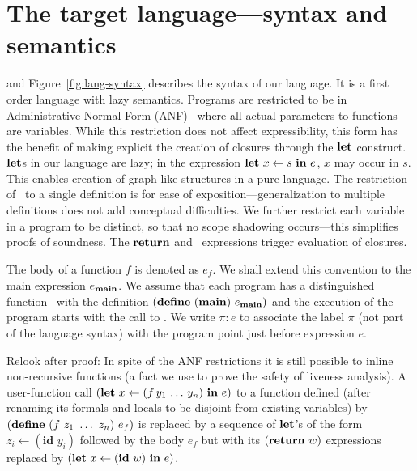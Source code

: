 \documentclass[9pt]{sigplanconf}
\newcommand{\ID}{\mbox{$\mathbf{ id}$}}
\begin{document}
\section{The target language---syntax and semantics}
\label{sec:defs}
and
Figure~\ref{fig:lang-syntax} describes the  syntax of our language. It
is a first order language with lazy semantics. Programs are restricted
to        be        in        Administrative        Normal        Form
(ANF)~\cite{chakravarty03perspective}  where all actual  parameters to
functions  are  variables.  While  this  restriction  does not  affect
expressibility,  this form  has  the benefit  of  making explicit  the
creation  of closures through  the $\mbox{$\mathbf{ let}$}$  construct.  $\mbox{$\mathbf{ let}$}$s  in our
language  are lazy;  in the  expression $\mbox{$\mathbf{ let}$}\,\,  x  \leftarrow s\,\,
\mbox{$\mathbf{ in}$}\,\, e$, $x$ may occur  in $s$. This enables creation of graph-like
structures in  a pure language. The  restriction of \LET\  to a single
definition  is  for ease  of  exposition---generalization to  multiple
definitions  does  not add conceptual  difficulties.  We  further
restrict each variable  in a program to be distinct,  so that no scope
shadowing   occurs---this  simplifies   proofs   of  soundness.    The
$\mbox{$\mathbf{ return}$}$ and \SIF\ expressions trigger evaluation of closures.

The body  of a function ${\mathit  f}$ is denoted  as $e_{\mathit f}$.
We   shall   extend   this   convention   to   the   main   expression
$e_{\mathbf{main}}$. We assume that each program has a distinguished function
\mainpgm\      with      the      definition     $(\mbox{$\mathbf{define}$}\      ({\tt
  \mathbf{main}})\  e_{\mathbf{main}})$ and  the execution  of the  program starts
with the call to \mainpgm.  We write $\pi\!:\!e$ to associate the label
$\pi$ (not  part of the language  syntax) with the  program point just
before expression $e$.

{ \color {Myblue} Relook after proof: In spite of the  ANF restrictions
it
  is still possible  to inline non-recursive functions (a  fact we use
  to  prove the safety  of liveness  analysis).  A  user-function call
  $(\mbox{$\mathbf{ let}$}\,\, x \leftarrow (f\,y_1\,\ldots\,y_n)  \,\, \mbox{$\mathbf{ in}$}\,\, e)$ to a
  function  defined  (after renaming  its  formals  and  locals to  be
  disjoint         from         existing         variables)         by
  $(\mbox{$\mathbf{define}$}\ (f\ z_1\ \ldots\ z_n)\ e_f)$ is replaced by a sequence of
  $\mbox{$\mathbf{ let}$}$'s of  the form  $z_i\leftarrow (\ID\,\,y_i)$ followed  by the
  body $e_f$  but with  its $(\mbox{$\mathbf{ return}$}\,\,w)$ expressions  replaced by
  $(\LET\,\, x \leftarrow (\ID\,\, w) \,\, \IN\,\, e)$.}
\end{document}
